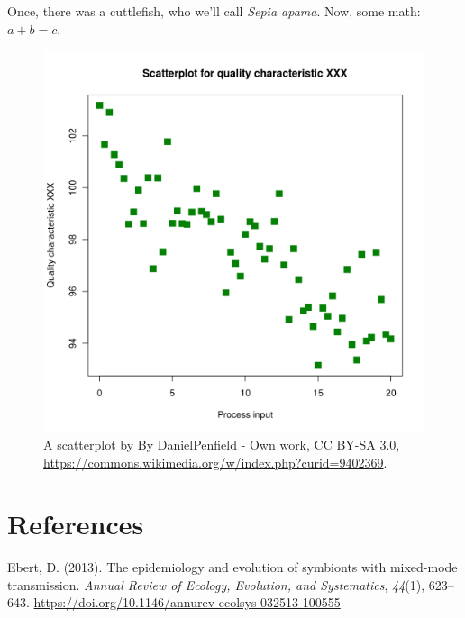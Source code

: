 \documentclass[10pt]{article}
\begin{document}
Once, there was a cuttlefish, who we'll call \emph{Sepia apama}. Now,
some math: \(a + b = c\).
\begin{figure}[h!]
\begin{center}
\includegraphics[width=0.70\columnwidth]{figures/scatterplot/scatterplot}
\caption{{A scatterplot by By DanielPenfield - Own work, CC BY-SA 3.0,
\url{https://commons.wikimedia.org/w/index.php?curid=9402369}.
{\label{286335}}%
}}
\end{center}
\end{figure}

\FloatBarrier
\section*{References}\sloppy
{}
\label{csl:1}Ebert, D. (2013). {The epidemiology and evolution of symbionts with mixed-mode transmission}. \textit{Annual Review of Ecology, Evolution, and Systematics}, \textit{44}(1), 623–643. \url{https://doi.org/10.1146/annurev-ecolsys-032513-100555}
\end{document}
